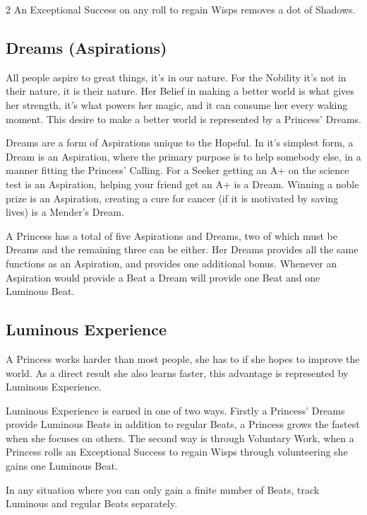 \begin{multicols}{2}
An Exceptional Success on any roll to regain Wisps removes a dot of Shadows.

\subsection*{Dreams (Aspirations)}
\label{subsec:Dreams} 

All people aspire to great things, it's in our nature. For the Nobility it's not in their nature, it is their nature. Her Belief in making a better world is what gives her strength, it's what powers her magic, and it can consume her every waking moment. This desire to make a better world is represented by a Princess' Dreams. 

Dreams are a form of Aspirations unique to the Hopeful. In it's simplest form, a Dream is an Aspiration, where the primary purpose is to help somebody else, in a manner fitting the Princess' Calling. For a Seeker getting an A+ on the science test is an Aspiration, helping your friend get an A+ is a Dream. Winning a noble prize is an Aspiration, creating a cure for cancer (if it is motivated by saving lives) is a Mender's Dream. 

A Princess has a total of five Aspirations and Dreams, two of which must be Dreams and the remaining three can be either. Her Dreams provides all the same functions as an Aspiration, and provides one additional bonus. Whenever an Aspiration would provide a Beat a Dream will provide one Beat and one Luminous Beat. 

\subsection*{Luminous Experience}
\label{subsec:LuminousExperience} 

A Princess works harder than most people, she has to if she hopes to improve the world. As a direct result she also learns faster, this advantage is represented by Luminous Experience. 

Luminous Experience is earned in one of two ways. Firstly a Princess' Dreams provide Luminous Beats in addition to regular Beats, a Princess grows the fastest when she focuses on others. The second way is through Voluntary Work, when a Princess rolls an Exceptional Success to regain Wisps through volunteering she gains one Luminous Beat.

In any situation where you can only gain a finite number of Beats, track Luminous and regular Beats separately. 


\end{multicols}
